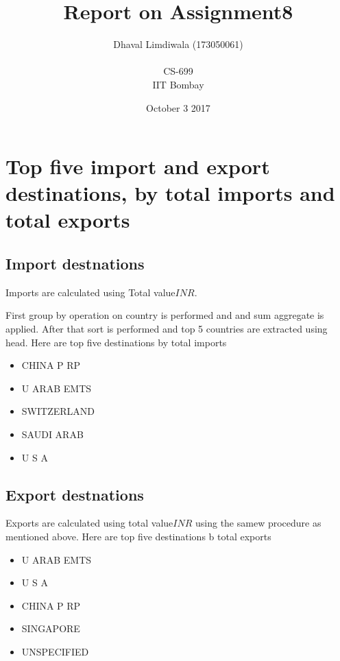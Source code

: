 \documentclass[12pt]{article}
\title{Report on Assignment8 }
\author{Dhaval Limdiwala (173050061) \\ \\ CS-699 \\ IIT Bombay}
\date{October 3 2017}
\begin{document}
\maketitle
\pagebreak
\tableofcontents
\pagebreak
\listoftables
\pagebreak
\listoffigures
\pagebreak
\section{Top five import and export destinations, by total imports and total exports}
\subsection{Import destnations}
\par {\ttfamily Imports are calculated using {\huge Total value\(INR\)}.}
\par First group by operation on country is performed and and sum aggregate is applied. After that sort is performed and top 5 countries are extracted using head.
Here are top five destinations by total imports

\begin{itemize}
	\item CHINA P RP
	\item U ARAB EMTS
	\item SWITZERLAND
	\item SAUDI ARAB
	\item U S A	
\end{itemize}
\subsection{Export destnations}
\par {\sffamily Exports are calculated using total value\(INR\) using the samew procedure as mentioned above.}
Here are top five destinations b total exports
\begin{itemize}
	\item U ARAB EMTS
	\item U S A
	\item CHINA P RP
	\item SINGAPORE
	\item UNSPECIFIED
\end{itemize}
\end{document}
